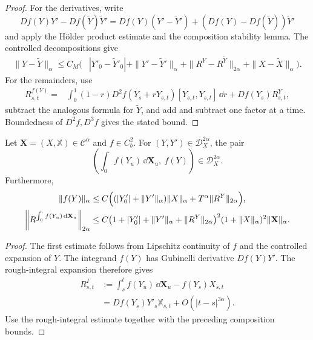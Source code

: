 \begin{proof}
For the derivatives, write
\[
 Df(Y)Y'-Df(\widetilde Y)\widetilde Y'
 =Df(Y)(Y'-\widetilde Y')
  +(Df(Y)-Df(\widetilde Y))\widetilde Y'
\]
and apply the Hölder product estimate and the composition stability lemma.
The controlled decompositions give
\begin{align*}
\|Y-\widetilde Y\|_\alpha
\le C_M\bigl(&|Y'_0-\widetilde Y'_0|
 +\|Y'-\widetilde Y'\|_\alpha
 +\|R^Y-R^{\widetilde Y}\|_{2\alpha}
 +\|X-\widetilde X\|_\alpha\bigr).
\end{align*}
For the remainders, use
\begin{align*}
R^{f(Y)}_{s,t}
={}&\int_0^1(1-r)
 D^2f(Y_s+rY_{s,t})[Y_{s,t},Y_{s,t}]\,\dd r
 +Df(Y_s)R^Y_{s,t},
\end{align*}
subtract the analogous formula for $\widetilde Y$, and add and subtract one
factor at a time.  Boundedness of $D^2f,D^3f$ gives the stated bound.
\end{proof}

\begin{lem}
Let $\mathbf X=(X,\mathbb X)\in\mathscr C^\alpha$ and $f\in C_b^2$.
For $(Y,Y')\in\mathscr D_X^{2\alpha}$, the pair
\[
 \left(\int_0^\cdot f(Y_u)\,\dd\mathbf X_u,\ f(Y)\right)
 \in\mathscr D_X^{2\alpha}.
\]
Furthermore,
\begin{align*}
 \|f(Y)\|_\alpha
 &\le C\Bigl((|Y'_0|+\|Y'\|_\alpha)\|X\|_\alpha
             +T^\alpha\|R^Y\|_{2\alpha}\Bigr),\\
 \left\|R^{\int_0^\cdot f(Y_u)\,\mathrm{d}\mathbf X_u}\right\|_{2\alpha}
 &\le C\bigl(1+|Y'_0|+\|Y'\|_\alpha+\|R^Y\|_{2\alpha}\bigr)^2
        (1+\|X\|_\alpha)^2\|\mathbf X\|_\alpha.
\end{align*}
\end{lem}

\begin{proof}
The first estimate follows from Lipschitz continuity of $f$ and the controlled
expansion of $Y$.  The integrand $f(Y)$ has Gubinelli derivative $Df(Y)Y'$.
The rough-integral expansion therefore gives
\begin{align*}
R^I_{s,t}
&:=\int_s^t f(Y_u)\,\dd\mathbf X_u-f(Y_s)X_{s,t}\\
&=Df(Y_s)Y'_s\mathbb X_{s,t}+O(|t-s|^{3\alpha}).
\end{align*}
Use the rough-integral estimate together with the preceding composition bounds.
\end{proof}

